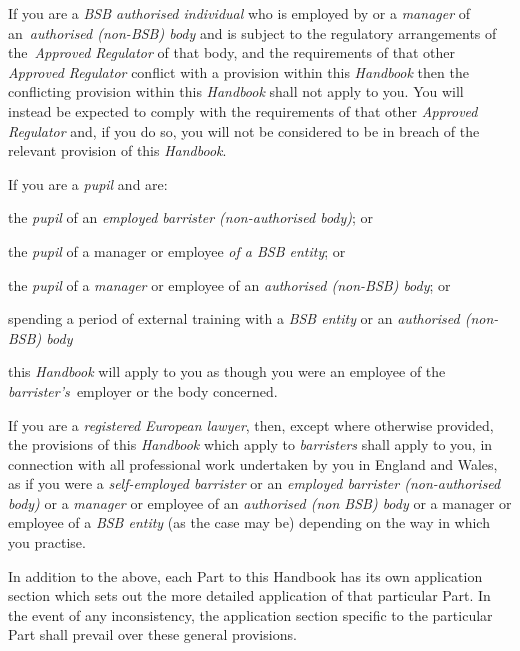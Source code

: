 
If you are a \emph{BSB authorised individual} who is employed by or a
\emph{manager} of an~\emph{authorised (non-BSB) body} and is subject to
the regulatory arrangements of the~\emph{Approved Regulator} of that
body, and the requirements of that other \emph{Approved Regulator}
conflict with a provision within this \emph{Handbook} then the
conflicting provision within this \emph{Handbook} shall not apply to
you. You will instead be expected to comply with the requirements of
that other \emph{Approved Regulator} and, if you do so, you will not be
considered to be in breach of the relevant provision of this
\emph{Handbook}.


If you are a \emph{pupil} and are:
\begin{numlist}\item the \emph{pupil} of an \emph{employed barrister (non-authorised
body)}; or
\item the \emph{pupil} of a manager or employee \emph{of a BSB entity}; or
\item the \emph{pupil} of a \emph{manager} or employee of an
\emph{authorised (non-BSB) body}; or
\item spending a period of external training with a \emph{BSB entity} or an
\emph{authorised (non-BSB) body}
\item this \emph{Handbook} will apply to you as though you were an employee
of the \emph{barrister's~}employer or the body concerned.
\end{numlist}

If you are a \emph{registered European lawyer}, then, except where
otherwise provided, the provisions of this \emph{Handbook} which apply
to \emph{barristers} shall apply to you, in connection with all
professional work undertaken by you in England and Wales, as if you were
a \emph{self-employed barrister} or an \emph{employed \emph{barrister
(non-authorised body)}} or a \emph{manager} or employee of an
\emph{authorised (non BSB) body} or a manager or employee of a \emph{BSB
entity} (as the case may be) depending on the way in which you practise.


In addition to the above, each Part to this Handbook has its own
application section which sets out the more detailed application of that
particular Part. In the event of any inconsistency, the application
section specific to the particular Part shall prevail over these general
provisions.

